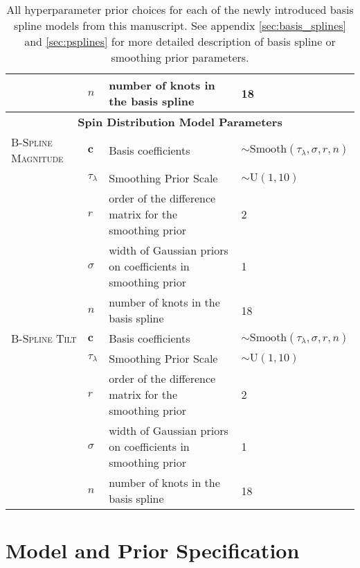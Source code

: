 \begin{table*}[b!]
\begin{tabular}{|l|l|l|l|}
     & $n$ & number of knots in the basis spline & 18 \\ \hline \hline 
    \multicolumn{4}{|c|}{\textbf{Spin Distribution Model Parameters}} \\ \hline
    \textsc{B-Spline Magnitude} & $\bm{c}$ &  Basis coefficients & $\sim \mathrm{Smooth}(\tau_\lambda, \sigma, r, n)$  \\ \cline{2-4} 
    & $\tau_\lambda$ & Smoothing Prior Scale & $\sim \mathrm{U}(1,10)$ \\ \cline{2-4}
    & $r$ & order of the difference matrix for the smoothing prior & 2 \\ \cline{2-4} 
    & $\sigma$ & width of Gaussian priors on coefficients in smoothing prior & 1 \\ \cline{2-4} 
    & $n$ & number of knots in the basis spline & 18 \\ \hline \hline 
    \textsc{B-Spline Tilt} & $\bm{c}$ &  Basis coefficients & $\sim \mathrm{Smooth}(\tau_\lambda, \sigma, r, n)$  \\ \cline{2-4} 
    & $\tau_\lambda$ & Smoothing Prior Scale & $\sim \mathrm{U}(1,10)$ \\ \cline{2-4}
    & $r$ & order of the difference matrix for the smoothing prior & 2 \\ \cline{2-4} 
    & $\sigma$ & width of Gaussian priors on coefficients in smoothing prior & 1 \\ \cline{2-4} 
    & $n$ & number of knots in the basis spline & 18 \\ \hline \hline
    \end{tabular}
    \caption{All hyperparameter prior choices for each of the newly introduced basis spline models from this manuscript. See appendix 
    \ref{sec:basis_splines} and \ref{sec:psplines} for more detailed description of basis spline or smoothing prior parameters.}
    \label{tab:model_priors}
\end{table*} 

\section{Model and Prior Specification} \label{sec:modelpriors}

